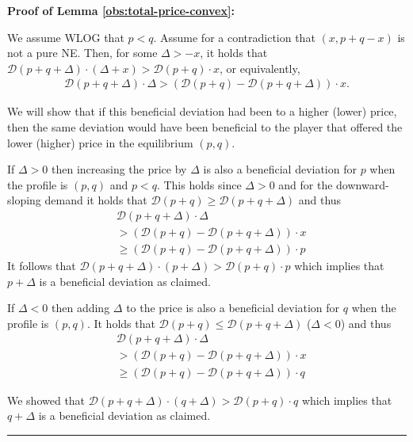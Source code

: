 \documentclass[11pt,a4paper]{article}
\newcommand{\qed}{\rule{1.5mm}{2mm}\vspace{0.1in}}
\newenvironment{proof}{\par\noindent{\bf Proof:}}{\qed}
\begin{document}
\noindent \textbf{Proof of Lemma \ref{obs:total-price-convex}:}
\begin{proof}
	We assume WLOG that $p<q$. Assume for a contradiction that $(x, p+q-x)$ is not a pure NE. Then, for some $\Delta>-x$, it holds that $\mathcal{D}(p+q+\Delta)\cdot (\Delta+x)> \mathcal{D}(p+q) \cdot x$, or equivalently,
	\begin{align*}
	\mathcal{D}(p+q+\Delta)\cdot \Delta> (\mathcal{D}(p+q)- \mathcal{D}(p+q+\Delta))\cdot x.
	\end{align*}
	
	We will show that if this beneficial deviation had been to a higher (lower) price, then the same deviation would have been beneficial to the player that offered the lower (higher) price in the equilibrium $(p,q)$.
	
	If $\Delta>0$ then increasing the price by $\Delta$ is also a beneficial deviation for $p$ when the profile is $(p,q)$ and $p<q$.
	This holds since $\Delta>0$ and for the downward-sloping demand it holds that $\mathcal{D}(p+q)\geq \mathcal{D}(p+q+\Delta)$ and thus
	\begin{align*}	
	& \mathcal{D}(p+q+\Delta)\cdot \Delta\\
	& > (\mathcal{D}(p+q)- \mathcal{D}(p+q+\Delta))\cdot x \\
	& \geq  (\mathcal{D}(p+q)- \mathcal{D}(p+q+\Delta))\cdot p
	\end{align*}
	It follows that $\mathcal{D}(p+q+\Delta)\cdot (p+\Delta)> \mathcal{D}(p+q)\cdot p$ which implies that $p+\Delta$ is a beneficial deviation as claimed.
	
	If $\Delta<0$ then adding $\Delta$ to the price is also a beneficial deviation for $q$ when the profile is $(p,q)$. It holds that $\mathcal{D}(p+q)\leq \mathcal{D}(p+q+\Delta)$ ($\Delta<0$) and thus
	\begin{align*}
	& \mathcal{D}(p+q+\Delta)\cdot \Delta \\
	&> (\mathcal{D}(p+q)- \mathcal{D}(p+q+\Delta))\cdot x\\
	& \geq (\mathcal{D}(p+q)- \mathcal{D}(p+q+\Delta))\cdot q
	\end{align*}
	
	We showed that $\mathcal{D}(p+q+\Delta)\cdot (q+\Delta)> \mathcal{D}(p+q)\cdot q$ which implies that $q+\Delta$ is a beneficial deviation as claimed.
\end{proof}
	

\end{document}
